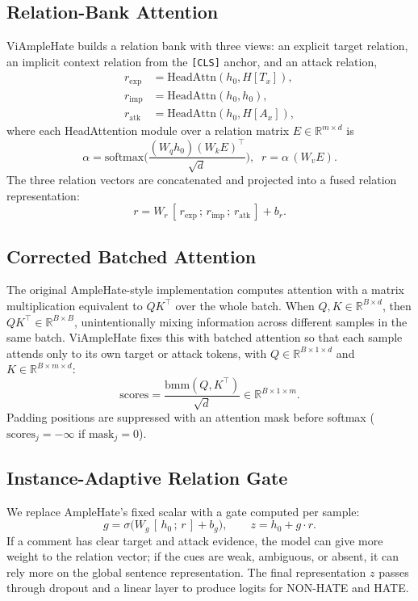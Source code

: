 \documentclass[11pt]{article}
\begin{document}
\subsection{Relation-Bank Attention}
ViAmpleHate builds a relation bank with three views: an explicit target relation, an implicit context relation from the \texttt{[CLS]} anchor, and an attack relation,
\begin{align}
  r_{\mathrm{exp}} &= \mathrm{HeadAttn}(h_0, H[T_x]), \nonumber\\
  r_{\mathrm{imp}} &= \mathrm{HeadAttn}(h_0, h_0), \\
  r_{\mathrm{atk}} &= \mathrm{HeadAttn}(h_0, H[A_x]), \nonumber
\end{align}
where each HeadAttention module over a relation matrix $E \in \mathbb{R}^{m\times d}$ is
\begin{equation}
  \alpha = \mathrm{softmax}\!\Big(\frac{(W_q h_0)(W_k E)^\top}{\sqrt d}\Big),\;\; r = \alpha\,(W_v E).
\end{equation}
The three relation vectors are concatenated and projected into a fused relation representation:
\begin{equation}
  r = W_r\,[\,r_{\mathrm{exp}}\,;\,r_{\mathrm{imp}}\,;\,r_{\mathrm{atk}}\,] + b_r.
\end{equation}

\subsection{Corrected Batched Attention}
The original AmpleHate-style implementation computes attention with a matrix multiplication equivalent to $QK^\top$ over the whole batch. When $Q,K\in\mathbb{R}^{B\times d}$, then $QK^\top\in\mathbb{R}^{B\times B}$, unintentionally mixing information across different samples in the same batch. ViAmpleHate fixes this with batched attention so that each sample attends only to its own target or attack tokens, with $Q\in\mathbb{R}^{B\times 1\times d}$ and $K\in\mathbb{R}^{B\times m\times d}$:
\begin{equation}
  \mathrm{scores} = \frac{\mathrm{bmm}(Q,K^\top)}{\sqrt d}\in\mathbb{R}^{B\times1\times m}.
\end{equation}
Padding positions are suppressed with an attention mask before softmax ($\mathrm{scores}_j = -\infty$ if $\mathrm{mask}_j=0$).

\subsection{Instance-Adaptive Relation Gate}
We replace AmpleHate's fixed scalar with a gate computed per sample:
\begin{equation}
  g = \sigma\big(W_g\,[\,h_0\,;\,r\,] + b_g\big),\qquad z = h_0 + g\cdot r.
\end{equation}
If a comment has clear target and attack evidence, the model can give more weight to the relation vector; if the cues are weak, ambiguous, or absent, it can rely more on the global sentence representation. The final representation $z$ passes through dropout and a linear layer to produce logits for NON-HATE and HATE.
\end{document}
